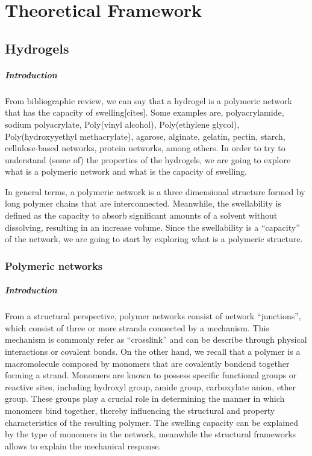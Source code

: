 \chapter{Theoretical Framework}\label{ch1:Intro}

\section{Hydrogels}

\paragraph{Introduction} From bibliographic review, we can say that a hydrogel is a polymeric network that has the capacity of swelling[cites].
Some examples are,
    polyacrylamide,
    sodium polyacrylate,
    Poly(vinyl alcohol),
    Poly(ethylene glycol),
    Poly(hydroxyyethyl methacrylate),
    agarose,
    alginate,
    gelatin,
    pectin,
    starch,
    cellulose-based networks,
    protein networks,
    among others.
In order to try to understand (some of) the properties of the hydrogels, we are going to explore what is a polymeric network and what is the capacity of swelling.

In general terms, a polymeric network is a three dimensional structure formed by long polymer chains that are interconnected.
Meanwhile, the swellability is defined as the capacity to absorb significant amounts of a solvent without dissolving, resulting in an increase volume.
Since the swellability is a ``capacity'' of the network, we are going to start by exploring what is a polymeric structure.

\subsection{Polymeric networks}

\paragraph{Introduction} From a structural perspective, polymer networks consist of network ``junctions'', which consist of three or more strands connected by a mechanism. 
This mechanism is commonly refer as ``crosslink'' and can be describe through physical interactions or covalent bonds.
On the other hand, we recall that a polymer is a macromolecule composed by monomers that are covalently bondend together forming a strand.
Monomers are known to possess specific functional groups or reactive sites, including 
    hydroxyl group,
    amide group,
    carboxylate anion,
    ether group. 
These groups play a crucial role in determining the manner in which monomers bind together, thereby influencing the structural and property characteristics of the resulting polymer.
The swelling capacity can be explained by the type of monomers in the network, meanwhile the structural frameworks allows to explain the mechanical response.

